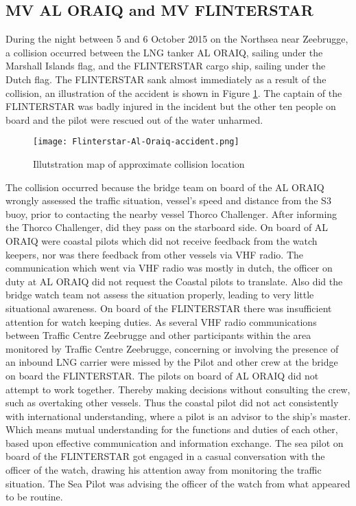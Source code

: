\newpage
\subsection{MV AL ORAIQ and MV FLINTERSTAR}
\label{sec:al-oraiq-vs-flinterstar}
During the night between 5 and 6 October 2015 on the Northsea near Zeebrugge, a collision occurred between the LNG tanker AL ORAIQ, sailing under the Marshall Islands flag, and the FLINTERSTAR cargo ship, sailing under the Dutch flag. The FLINTERSTAR sank almost immediately as a result of the collision, an illustration of the accident is shown in Figure \ref{fig:Accident-Flinterstar-Al-Oraiq}. The captain of the FLINTERSTAR was badly injured in the incident but the other ten people on board and the pilot were rescued out of the water unharmed.

\begin{figure}[H]
	\centering
	\texttt{[image: Flinterstar-Al-Oraiq-accident.png]}
	\caption{Illutstration map of approximate collision location}
	\label{fig:Accident-Flinterstar-Al-Oraiq}
\end{figure}

The collision occurred because the bridge team on board of the AL ORAIQ wrongly assessed the traffic situation, vessel's speed and distance from the S3 buoy, prior to contacting the nearby vessel Thorco Challenger. After informing the Thorco Challenger, did they pass on the starboard side. On board of AL ORAIQ were coastal pilots which did not receive feedback from the watch keepers, nor was there feedback from other vessels via \ac{VHF} radio. The communication which went via VHF radio was mostly in dutch, the officer on duty at AL ORAIQ did not request the Coastal pilots to translate. Also did the bridge watch team not assess the situation properly, leading to very little situational awareness.
On board of the FLINTERSTAR there was insufficient attention for watch keeping duties. As several VHF radio communications between Traffic Centre Zeebrugge and other participants within the area monitored by Traffic Centre Zeebrugge, concerning or involving the presence of an inbound LNG carrier were missed by the Pilot and other crew at the bridge on board the FLINTERSTAR.
The pilots on board of AL ORAIQ did not attempt to work together. Thereby making decisions without consulting the crew, such as overtaking other vessels. Thus the coastal pilot did not act consistently with international understanding, where a pilot is an advisor to the ship's master. Which means mutual understanding for the functions and duties of each other, based upon effective communication and information exchange. 
The sea pilot on board of the FLINTERSTAR got engaged in a casual conversation with the officer of the watch, drawing his attention away from monitoring the traffic situation. The Sea Pilot was advising the officer of the watch from what appeared to be routine. \cite{Backer2015}

